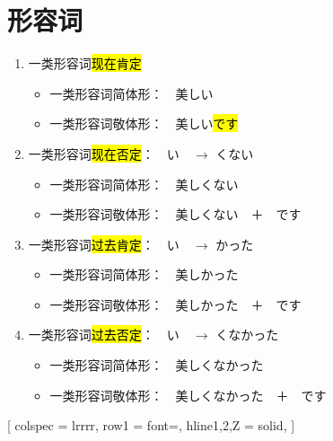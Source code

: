 \section{形容词}

\begin{enumerate}
  \item 一类形容词\hl{现在肯定}
    \begin{itemize}
      \item 一类形容词简体形：　美しい
      \item 一类形容词敬体形：　美しい\hl{です}
    \end{itemize}
  \item 一类形容词\hl{现在否定}：　い　$\rightarrow$ くない
    \begin{itemize}
      \item 一类形容词简体形：　美しくない
      \item 一类形容词敬体形：　美しくない　＋　です
    \end{itemize}
  \item 一类形容词\hl{过去肯定}：　い　$\rightarrow$ かった
    \begin{itemize}
      \item 一类形容词简体形：　美しかった
      \item 一类形容词敬体形：　美しかった　＋　です
    \end{itemize}
  \item 一类形容词\hl{过去否定}：　い　$\rightarrow$ くなかった
    \begin{itemize}
      \item 一类形容词简体形：　美しくなかった
      \item 一类形容词敬体形：　美しくなかった　＋　です
    \end{itemize}
\end{enumerate}


[
  colspec = {lrrrr},
  row{1} = {font=\bfseries},
  hline{1,2,Z} = {solid},
]

